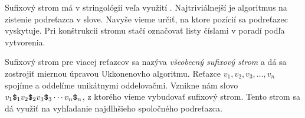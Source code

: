 Sufixový strom má v stringológií veľa využití
\citep{gusfield}. Najtriviálnejší je algoritmus na zistenie podreťazca v 
slove. Navyše vieme určiť, na ktore pozícií sa podreťazec vyskytuje. Pri 
konštrukcii stromu stačí označovať listy číslami v poradí podľa vytvorenia. 

Sufixový strom pre viacej reťazcov sa nazýva \emph{všeobecný sufixový strom} 
a dá sa zostrojiť miernou úpravou Ukkonenovho algoritmu. Reťazce $v_1, v_2, 
v_3, \ldots, v_n$ spojíme a oddelíme unikátnymi oddelovačmi. Vznikne nám slovo 
$v_1\hbox{\tt\$}_1v_2\hbox{\tt\$}_2v_3\hbox{\tt\$}_3\cdots v_n\hbox{\tt\$}_n$, z ktorého vieme vybudovať sufixový 
strom. Tento strom sa dá využiť na vyhľadanie najdlhšieho spoločného 
podreťazca. 

% 
% 


